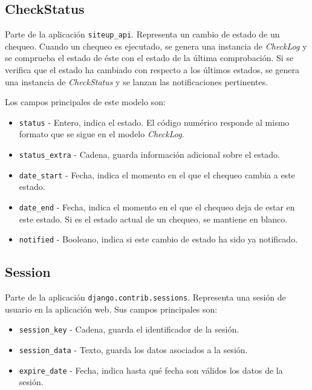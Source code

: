 \subsection{CheckStatus}

Parte de la aplicación \texttt{siteup\_api}. Representa un cambio de estado de
un chequeo. Cuando un chequeo es ejecutado, se genera una instancia de
\textit{CheckLog} y se comprueba el estado de éste con el estado de la última
comprobación. Si se verifica que el estado ha cambiado con respecto a los
últimos estados, se genera una instancia de \textit{CheckStatus} y se lanzan las
notificaciones pertinentes.

Los campos principales de este modelo son:

\begin{itemize}
\item \texttt{status} - Entero, indica el estado. El código numérico responde al
  mismo formato que se sigue en el modelo \textit{CheckLog}.
\item \texttt{status\_extra} - Cadena, guarda información adicional sobre el estado.
\item \texttt{date\_start} - Fecha, indica el momento en el que el chequeo
  cambia a este estado.
\item \texttt{date\_end} - Fecha, indica el momento en el que el chequeo deja de
  estar en este estado. Si es el estado actual de un chequeo, se mantiene en blanco.
\item \texttt{notified} - Booleano, indica si este cambio de estado ha sido ya notificado.

\end{itemize}

\subsection{Session}

Parte de la aplicación \texttt{django.contrib.sessions}. Representa una sesión
de usuario en la aplicación web. Sus campos principales son:

\begin{itemize}
\item \texttt{session\_key} - Cadena, guarda el identificador de la sesión.
\item \texttt{session\_data} - Texto, guarda los datos asociados a la sesión.
\item \texttt{expire\_date} - Fecha, indica hasta qué fecha son válidos los
  datos de la sesión.
\end{itemize}

